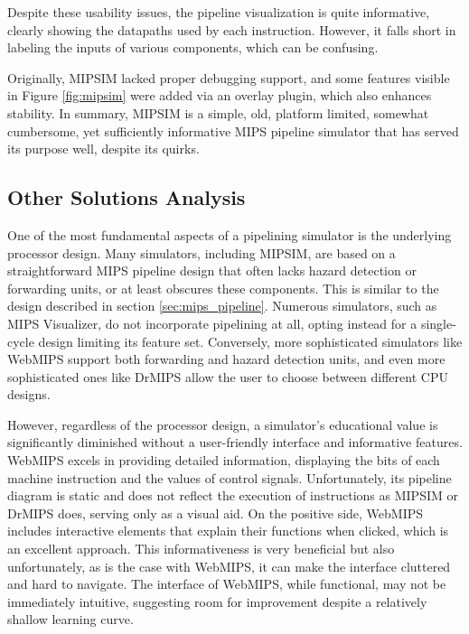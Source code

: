Despite these usability issues, the pipeline visualization is quite informative, clearly showing the datapaths used by each instruction. However, it falls short in labeling the inputs of various components, which can be confusing. 

Originally, MIPSIM lacked proper debugging support, and some features visible in Figure \ref{fig:mipsim} were added via an overlay plugin, which also enhances stability. In summary, MIPSIM is a simple, old, platform limited, somewhat cumbersome, yet sufficiently informative MIPS pipeline simulator that has served its purpose well, despite its quirks.


\subsection{Other Solutions Analysis}\label{sec:other_solutions_analysis}

One of the most fundamental aspects of a pipelining simulator is the underlying processor design. Many simulators, including MIPSIM, are based on a straightforward MIPS pipeline design that often lacks hazard detection or forwarding units, or at least obscures these components. This is similar to the design described in section \ref{sec:mips_pipeline}. Numerous simulators, such as MIPS Visualizer, do not incorporate pipelining at all, opting instead for a single-cycle design limiting its feature set. Conversely, more sophisticated simulators like WebMIPS support both forwarding and hazard detection units, and even more sophisticated ones like DrMIPS allow the user to choose between different CPU designs.

However, regardless of the processor design, a simulator's educational value is significantly diminished without a user-friendly interface and informative features. WebMIPS excels in providing detailed information, displaying the bits of each machine instruction and the values of control signals. Unfortunately, its pipeline diagram is static and does not reflect the execution of instructions as MIPSIM or DrMIPS does, serving only as a visual aid. On the positive side, WebMIPS includes interactive elements that explain their functions when clicked, which is an excellent approach. This informativeness is very beneficial but also unfortunately, as is the case with WebMIPS, it can make the interface cluttered and hard to navigate. The interface of WebMIPS, while functional, may not be immediately intuitive, suggesting room for improvement despite a relatively shallow learning curve. 


